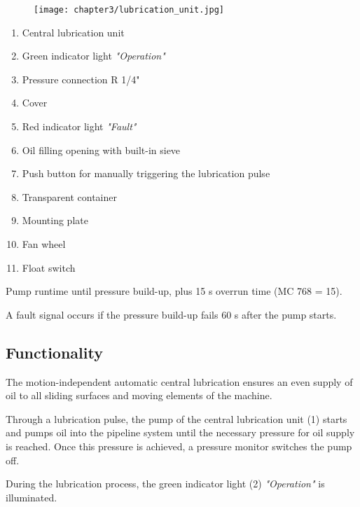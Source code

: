 
\begin{figure}[h]
    \centering
    \texttt{[image: chapter3/lubrication\_unit.jpg]}
\end{figure}

\begin{enumerate}
    \item Central lubrication unit
    \item Green indicator light \textit{"Operation"}
    \item Pressure connection R 1/4"
    \item Cover
    \item Red indicator light \textit{"Fault"}
    \item Oil filling opening with built-in sieve
    \item Push button for manually triggering the lubrication pulse
    \item Transparent container
    \item Mounting plate
    \item Fan wheel
    \item Float switch
\end{enumerate}


Pump runtime until pressure build-up, plus 15 s overrun time (MC 768 = 15).

A fault signal occurs if the pressure build-up fails 60 s after the pump starts.


\subsection*{Functionality}

The motion-independent automatic central lubrication ensures an even supply of oil to all sliding surfaces and moving elements of the machine.

Through a lubrication pulse, the pump of the central lubrication unit (1) starts and pumps oil into the pipeline system until the necessary pressure for oil supply is reached. Once this pressure is achieved, a pressure monitor switches the pump off.

During the lubrication process, the green indicator light (2) \textit{"Operation"} is illuminated.

